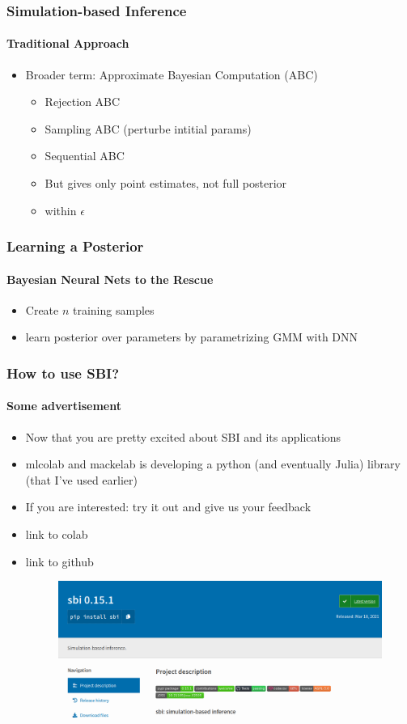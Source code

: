 \documentclass[9pt]{beamer}
\begin{document}
\begin{frame}
\frametitle{Simulation-based Inference}
\framesubtitle{Traditional Approach}
\begin{itemize}
	\item Broader term: Approximate Bayesian Computation (ABC)
	\begin{itemize}
		\item Rejection ABC
		\item Sampling ABC (perturbe intitial params)
		\item Sequential ABC
	\end{itemize}
	\begin{itemize}
		\item But gives only point estimates, not full posterior
		\item within $\epsilon$
	\end{itemize}	
\end{itemize}
\end{frame} 




\begin{frame}
\frametitle{Learning a Posterior}
\framesubtitle{Bayesian Neural Nets to the Rescue}
\begin{itemize}
	\item Create $n$ training samples
	\item learn posterior over parameters by parametrizing GMM with DNN
\end{itemize}
\end{frame} 




\begin{frame}
\frametitle{How to use SBI?}
\framesubtitle{Some advertisement}
\begin{itemize}
	\item Now that you are pretty excited about SBI and its applications
	\item mlcolab and mackelab is developing a python (and eventually Julia) library (that I've used earlier)
	\item If you are interested: try it out and give us your feedback
	\item link to colab
	\item link to github
		\begin{figure}
		\flushleft
		\includegraphics[width=.75\linewidth]{figures/sbipypi.png}
	\end{figure}
\end{itemize}
\end{frame} 
\end{document}

